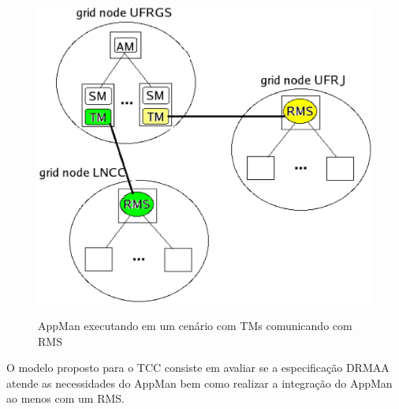 \begin{figure}[hpts]
\center
\includegraphics[scale=.2]{img/AppManRMS.eps}
\label{AppManRMS}
\caption{AppMan executando em um cenário com TMs comunicando com RMS}
\end{figure}

O modelo proposto para o TCC consiste em avaliar se a especificação DRMAA atende as necessidades do AppMan bem como realizar a integração do AppMan ao menos com um RMS.
